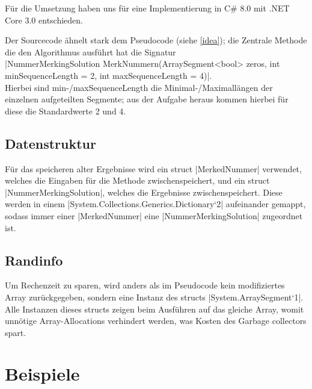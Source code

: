 \documentclass[a4paper,10pt,ngerman]{scrartcl}
\begin{document}
Für die Umsetzung haben uns für eine Implementierung in C\# 8.0 mit
.NET Core 3.0 entschieden.

Der Sourcecode ähnelt stark dem Pseudocode (siehe \cref{idea});
die Zentrale Methode die den Algorithmus ausführt hat die Signatur\\
|NummerMerkingSolution MerkNummern(ArraySegment<bool> zeros, int minSequenceLength = 2, int maxSequenceLength = 4)|.\\
Hierbei sind min-/maxSequenceLength die Minimal-/Maximallängen
der einzelnen aufgeteilten Segmente; aus der Aufgabe heraus kommen hierbei
für diese die Standardwerte 2 und 4.

\subsection{Datenstruktur}

Für das speicheren alter Ergebnisse wird ein struct |MerkedNummer|
verwendet, welches die Eingaben für die Methode zwischenspeichert,
und ein struct |NummerMerkingSolution|, welches die Ergebnisse
zwischenspeichert. Diese werden in einem
|System.Collections.Generics.Dictionary`2| aufeinander gemappt,
sodass immer einer |MerkedNummer| eine |NummerMerkingSolution|
zugeordnet ist.

\subsection{Randinfo}

Um Rechenzeit zu sparen, wird anders als im Pseudocode kein modifiziertes
Array zurückgegeben, sondern eine Instanz des structs |System.ArraySegment`1|.
Alle Instanzen dieses structs zeigen beim Ausführen auf das gleiche Array,
womit unnötige Array-Allocations verhindert werden, was Kosten des
Garbage collectors spart.

\section{Beispiele}
\end{document}
